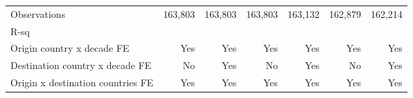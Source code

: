 \begin{tabular}{l*{6}{r}}
Observations        &     163,803         &     163,803         &     163,803         &     163,132         &     162,879         &     162,214         \\
R-sq                &                     &                     &                     &                     &                     &                     \\
Origin country x decade FE&         Yes         &         Yes         &         Yes         &         Yes         &         Yes         &         Yes         \\
Destination country x decade FE&          No         &         Yes         &          No         &         Yes         &          No         &         Yes         \\
Origin x destination countries FE&         Yes         &         Yes         &         Yes         &         Yes         &         Yes         &         Yes         \\
\bottomrule \end{tabular}
